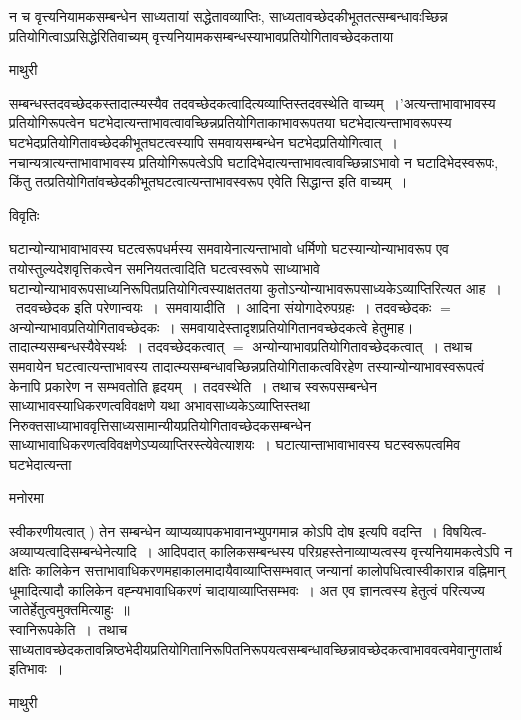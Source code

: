 \documentclass[10pt, openany]{book}
\begin{document}
{न च वृत्त्यनियामकसम्बन्धेन साध्यतायां सद्धेतावव्याप्तिः, साध्यतावच्छेदकीभूततत्सम्बन्धावःच्छिन्न प्रतियोगित्वाऽप्रसिद्धेरितिवाच्यम् वृत्त्यनियामकसम्बन्धस्याभावप्रतियोगितावच्छेदकताया
\newpage
\begin{center}  माथुरी  \end{center}
{\la सम्बन्धस्तदवच्छेदकस्तादात्म्यस्यैव तदवच्छेदकत्वादित्यव्याप्तिस्तदवस्थेति वाच्यम्~।'अत्यन्ताभावाभावस्य प्रतियोगिरूपत्वेन घटभेदात्यन्ताभावत्वावच्छिन्नप्रतियोगिताकाभावरूपतया घटभेदात्यन्ताभावरूपस्य घटभेदप्रतियोगितावच्छेदकीभूतघटत्वस्यापि समवायसम्बन्धेन घटभेदप्रतियोगित्वात्~। नचान्यत्रात्यन्ताभावाभावस्य  प्रतियोगिरूपत्वेऽपि घटादिभेदात्यन्ताभावत्वावच्छिन्नाऽभावो न  घटादिभेदस्वरूपः, किंतु तत्प्रतियोगितांवच्छेदकीभूतघटत्वात्यन्ताभावस्वरूप एवेति सिद्धान्त इति वाच्यम्~।}
\begin{center}     विवृतिः \end{center}
घटान्योन्याभावाभावस्य घटत्वरूपधर्मस्य समवायेनात्यन्ताभावो धर्मिणो घटस्यान्योन्याभावरूप एव तयोस्तुल्यदेशवृत्तिकत्वेन समनियतत्वादिति घटत्वस्वरूपे
साध्याभावे घटान्योन्याभावरूपसाध्यनिरूपितप्रतियोगित्वस्याक्षततया कुतोऽन्योन्याभावरूपसाध्यकेऽव्याप्तिरित्यत आह~।~तदवच्छेदक इति परेणान्वयः~।~{\la समवायादीति~।} आदिना संयोगादेरुपग्रहः~। तदवच्छेदकः $=$ अन्योन्याभावप्रतियोगितावच्छेदकः~। समवायादेस्तादृशप्रतियोगितानवच्छेदकत्वे हेतुमाह। तादात्म्यसम्बन्धस्यैवेस्यर्थः~। तदवच्छेदकत्वात् $=$ अन्योन्याभावप्रतियोगितावच्छेदकत्वात्~। तथाच समवायेन घटत्वात्यन्ताभावस्य
तादात्म्यसम्बन्धावच्छिन्नप्रतियोगिताकत्वविरहेण तस्यान्योन्याभावस्वरूपत्वं केनापि प्रकारेण न सम्भवतोति हृदयम्~। {\la तदवस्थेति}~। तथाच स्वरूपसम्बन्धेन साध्याभावस्याधिकरणत्वविवक्षणे यथा अभावसाध्यकेऽव्याप्तिस्तथा निरुक्तसाध्याभाववृत्तिसाध्यसामान्यीयप्रतियोगितावच्छेदकसम्बन्धेन साध्याभावाधिकरणत्वविवक्षणेऽप्यव्याप्तिरस्त्येवेत्याशयः~। घटात्यान्ताभावाभावस्य घटस्वरूपत्वमिव घटभेदात्यन्ता
\begin{center}   मनोरमा  \end{center}
स्वीकरणीयत्वात् ) तेन सम्बन्धेन व्याप्यव्यापकभावानभ्युपगमान्न कोऽपि दोष इत्यपि वदन्ति~। {\la विषयित्व-अव्याप्यत्वादिसम्बन्धेनेत्यादि}~। आदिपदात् कालिकसम्बन्धस्य
परिग्रहस्तेनाव्याप्यत्वस्य वृत्त्यनियामकत्वेऽपि न क्षतिः कालिकेन सत्ताभावाधिकरणमहाकालमादायैवाव्याप्तिसम्भवात् जन्यानां कालोपधित्वास्वीकारान्न वह्निमान् धूमादित्यादौ कालिकेन वह्न्यभावाधिकरणं चादायाव्याप्तिसम्भवः~। अत एव ज्ञानत्वस्य हेतुत्वं परित्यज्य जातेर्हेतुत्वमुक्तमित्याहुः~॥\\

{\la स्वानिरूपकेति}~।~तथाच साध्यतावच्छेदकतावन्निष्ठभेदीयप्रतियोगितानिरूपितनिरूपयत्वसम्बन्धावच्छिन्नावच्छेदकत्वाभाववत्वमेवानुगतार्थ इतिभावः~।
\newpage
\begin{center}  माथुरी  \end{center}

}
\end{document}

